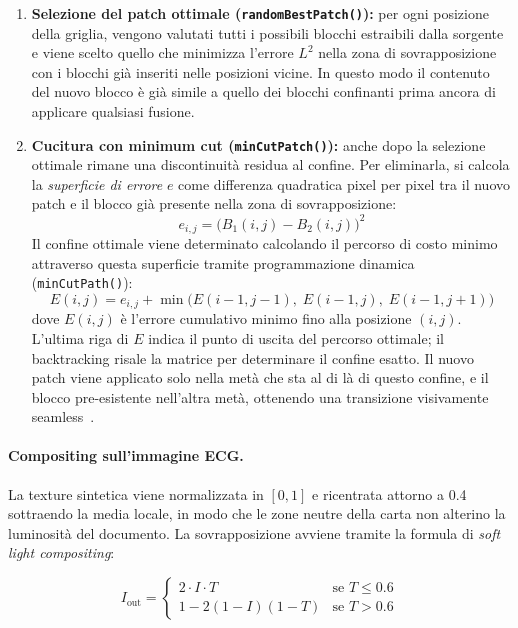 \begin{enumerate}
    \item \textbf{Selezione del patch ottimale (\texttt{randomBestPatch()}):} per ogni posizione della griglia, vengono valutati tutti i possibili blocchi estraibili dalla sorgente e viene scelto quello che minimizza l'errore $L^2$ nella zona di sovrapposizione con i blocchi già inseriti nelle posizioni vicine. In questo modo il contenuto del nuovo blocco è già simile a quello dei blocchi confinanti prima ancora di applicare qualsiasi fusione.
    \item \textbf{Cucitura con minimum cut (\texttt{minCutPatch()}):} anche dopo la selezione ottimale rimane una discontinuità residua al confine. Per eliminarla, si calcola la \textit{superficie di errore} $e$ come differenza quadratica pixel per pixel tra il nuovo patch e il blocco già presente nella zona di sovrapposizione:
    \[
        e_{i,j} = \bigl(B_1(i,j) - B_2(i,j)\bigr)^2
    \]
    Il confine ottimale viene determinato calcolando il percorso di costo minimo attraverso questa superficie tramite programmazione dinamica (\texttt{minCutPath()}):
    \[
        E(i,j) = e_{i,j} + \min\bigl(E(i-1,j-1),\; E(i-1,j),\; E(i-1,j+1)\bigr)
    \]
    dove $E(i,j)$ è l'errore cumulativo minimo fino alla posizione $(i,j)$. L'ultima riga di $E$ indica il punto di uscita del percorso ottimale; il backtracking risale la matrice per determinare il confine esatto. Il nuovo patch viene applicato solo nella metà che sta al di là di questo confine, e il blocco pre-esistente nell'altra metà, ottenendo una transizione visivamente seamless~\cite{ecgimagekitpaper}.
\end{enumerate}

\paragraph{Compositing sull'immagine ECG.} La texture sintetica viene normalizzata in $[0,1]$ e ricentrata attorno a 0.4 sottraendo la media locale, in modo che le zone neutre della carta non alterino la luminosità del documento. La sovrapposizione avviene tramite la formula di \textit{soft light compositing}:

\begin{equation}
I_{\text{out}} = \begin{cases}
2 \cdot I \cdot T & \text{se } T \leq 0.6 \\
1 - 2(1-I)(1-T) & \text{se } T > 0.6
\end{cases}
\end{equation}


